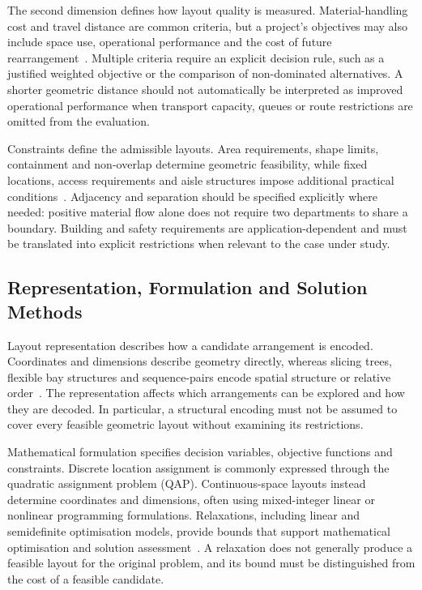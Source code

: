 \documentclass[10pt,a4paper]{article}
\begin{document}
The second dimension defines how layout quality is measured. Material-handling
cost and travel distance are common criteria, but a project's objectives may
also include space use, operational performance and the cost of future
rearrangement\ \cite{drira2007,perez2021}. Multiple criteria require an explicit
decision rule, such as a justified weighted objective or the comparison of
non-dominated alternatives. A shorter geometric distance should not automatically
be interpreted as improved operational performance when transport capacity,
queues or route restrictions are omitted from the evaluation.

Constraints define the admissible layouts. Area requirements, shape limits,
containment and non-overlap determine geometric feasibility, while fixed
locations, access requirements and aisle structures impose additional practical
conditions\ \cite{anjos2017,liu2004}. Adjacency and separation should be specified
explicitly where needed: positive material flow alone does not require two
departments to share a boundary. Building and safety requirements are application-dependent and must be
translated into explicit restrictions when relevant to the case under study.

\subsection{Representation, Formulation and Solution Methods}

Layout representation describes how a candidate arrangement is encoded.
Coordinates and dimensions describe geometry directly, whereas slicing trees,
flexible bay structures and sequence-pairs encode spatial structure or relative
order\ \cite{anjos2017,liu2004}. The representation affects which arrangements
can be explored and how they are decoded. In particular, a structural encoding
must not be assumed to cover every feasible geometric layout without examining
its restrictions.

Mathematical formulation specifies decision variables, objective functions and
constraints. Discrete location assignment is commonly expressed through the
quadratic assignment problem (QAP). Continuous-space layouts instead determine
coordinates and dimensions, often using mixed-integer linear or nonlinear
programming formulations. Relaxations, including linear and semidefinite
optimisation models, provide bounds that support mathematical optimisation
and solution assessment\ \cite{anjos2017}. A relaxation does not generally
produce a feasible layout for the original problem, and its bound must be
distinguished from the cost of a feasible candidate.
\end{document}
